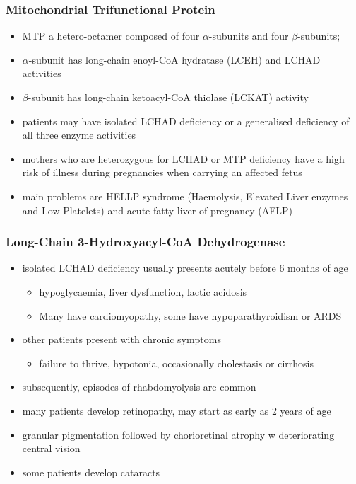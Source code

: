 \documentclass{scrartcl}
\begin{document}
\subsubsection{Mitochondrial Trifunctional Protein}
\label{sec:org463d04c}
\begin{itemize}
\item MTP a hetero-octamer composed of four \(\alpha\)-subunits and four \(\beta\)-subunits;
\item \(\alpha\)-subunit has long-chain enoyl-CoA hydratase (LCEH) and LCHAD activities
\item \(\beta\)-subunit has long-chain ketoacyl-CoA thiolase (LCKAT) activity
\item patients may have isolated LCHAD deficiency or a generalised deficiency of all three enzyme activities

\item mothers who are heterozygous for LCHAD or MTP deficiency have a high
risk of illness during pregnancies when carrying an affected fetus
\item main problems are HELLP syndrome (Haemolysis, Elevated Liver
enzymes and Low Platelets) and acute fatty liver of pregnancy
(AFLP)
\end{itemize}

\subsubsection{Long-Chain 3-Hydroxyacyl-CoA Dehydrogenase}
\label{sec:org9e9116b}
\begin{itemize}
\item isolated LCHAD deficiency usually presents acutely before 6 months of age
\begin{itemize}
\item hypoglycaemia, liver dysfunction, lactic acidosis
\item Many have cardiomyopathy, some have hypoparathyroidism or ARDS
\end{itemize}
\item other patients present with chronic symptoms
\begin{itemize}
\item failure to thrive, hypotonia, occasionally cholestasis or cirrhosis
\end{itemize}
\item subsequently, episodes of rhabdomyolysis are common
\item many patients develop retinopathy, may start as early as 2 years of age
\item granular pigmentation followed by chorioretinal atrophy w deteriorating central vision
\item some patients develop cataracts
\end{itemize}
\end{document}
